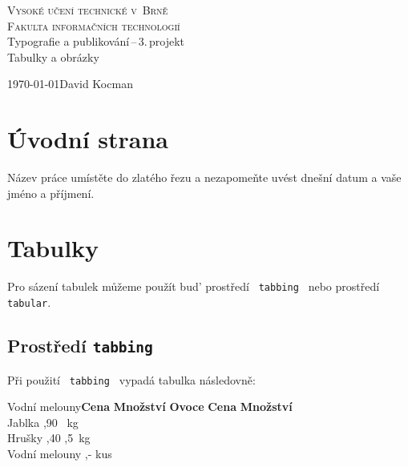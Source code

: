 \documentclass[11pt]{article}
\begin{document}
\begin{titlepage}
\begin{center}
    \textsc{\Huge{Vysoké učení technické v~Brně} \vspace{0.4em} \\
    \huge{Fakulta informačních technologií}}\\
    {\LARGE{Typografie a publikování\,--\,3.\,projekt}\vspace{0.3em}\\
    \Huge{Tabulky a obrázky}}    
\end{center}
{\Large \today \hfill David Kocman}
\end{titlepage}

\section{Úvodní strana}
    Název práce umístěte do zlatého řezu a nezapomeňte uvést dnešní datum a vaše jméno a příjmení.
    
\section{Tabulky}
    Pro sázení tabulek můžeme použít bud’ prostředí \texttt{ tabbing } nebo prostředí \texttt{ tabular}.
    
\subsection{Prostředí \texttt{tabbing}}
    Při použití \texttt{ tabbing } vypadá tabulka následovně:
    
   \begin{tabbing}
        Vodní melouny\quad \=\textbf{Cena} \quad \= \textbf{Množství}  \quad  \kill
        \textbf{Ovoce} \> \textbf{Cena} \> \textbf{Množství}  \\
        Jablka ,90 ~kg \\
        Hrušky ,40 ,5~kg \\
        Vodní melouny ,-  kus \\
\end{tabbing}

\end{document}
